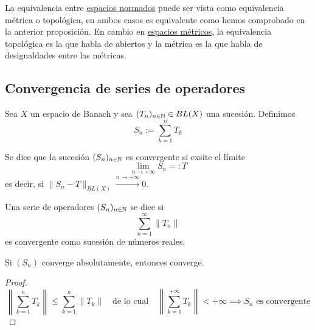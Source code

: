 \begin{observacion}
    La equivalencia entre \underline{espacios normados} puede ser vista como equivalencia métrica o topológica, en ambos casos es equivalente como hemos comprobado en la anterior proposición. En cambio en \underline{espacios métricos}, la equivalencia topológica es la que habla de abiertos y la métrica es la que habla de desigualdades entre las métricas.
\end{observacion}


\subsection{Convergencia de series de operadores}

\noindent 
Sea $X$ un espacio de Banach y sea $(T_n)_{n\in\mathbb{N}} \in BL(X)$ una sucesión. Definimos 
$$S_n := \sum_{k=1}^{n} T_k$$

\begin{definicion}
    Se dice que la sucesión $(S_n)_{n\in\mathbb{N}}$ es convergente si exsite el límite
    \begin{equation*}
        \lim_{n \to +\infty} S_n =: T
    \end{equation*}
    es decir, si $\|S_n - T\|_{BL(X)} \xrightarrow{n \to +\infty} 0$.
\end{definicion}

\begin{definicion}
    Una serie de operadores $(S_n)_{n\in\mathbb{N}}$ se dice  si 
    $$\sum_{n=1}^{\infty} \|T_n\|$$
    es convergente como sucesión de números reales.
\end{definicion}

\begin{observacion}
    Si $(S_n)$ converge absolutamente, entonces converge.
    \begin{proof}
        \begin{equation*}
            \left\|\sum_{k=1}^{n} T_k \right\| \leq \sum_{k=1}^{n} \|T_k\| \quad \text{de lo cual} \quad \left\|\sum_{k=1}^{+\infty} T_k\right\| < +\infty \implies S_n \text{ es convergente}
        \end{equation*}
    \end{proof}
\end{observacion}

